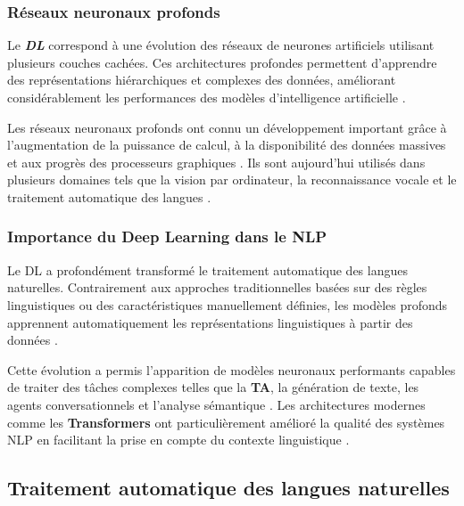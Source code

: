 \subsubsection{Réseaux neuronaux profonds}

Le \textbf{\textit{\ac{DL}}} correspond à une évolution des réseaux de neurones artificiels utilisant plusieurs couches cachées. Ces architectures profondes permettent d'apprendre des représentations hiérarchiques et complexes des données, améliorant considérablement les performances des modèles d'intelligence artificielle \cite{Goodfellow-et-al-2016}.

Les réseaux neuronaux profonds ont connu un développement important grâce à l'augmentation de la puissance de calcul, à la disponibilité des données massives et aux progrès des processeurs graphiques \cite{Goodfellow-et-al-2016}. Ils sont aujourd'hui utilisés dans plusieurs domaines tels que la vision par ordinateur, la reconnaissance vocale et le traitement automatique des langues \cite{ranathunga2023neural}.

\subsubsection{Importance du Deep Learning dans le \ac{NLP}}

Le \ac{DL} a profondément transformé le traitement automatique des langues naturelles. Contrairement aux approches traditionnelles basées sur des règles linguistiques ou des caractéristiques manuellement définies, les modèles profonds apprennent automatiquement les représentations linguistiques à partir des données \cite{Goodfellow-et-al-2016, ranathunga2023neural}.

Cette évolution a permis l'apparition de modèles neuronaux performants capables de traiter des tâches complexes telles que la \textbf{\ac{TA}}, la génération de texte, les agents conversationnels et l'analyse sémantique \cite{ranathunga2023neural, agyei2025dynamic}. Les architectures modernes comme les \textbf{Transformers} ont particulièrement amélioré la qualité des systèmes \ac{NLP} en facilitant la prise en compte du contexte linguistique \cite{vaswani2017attention}.

\subsection{Traitement automatique des langues naturelles}

